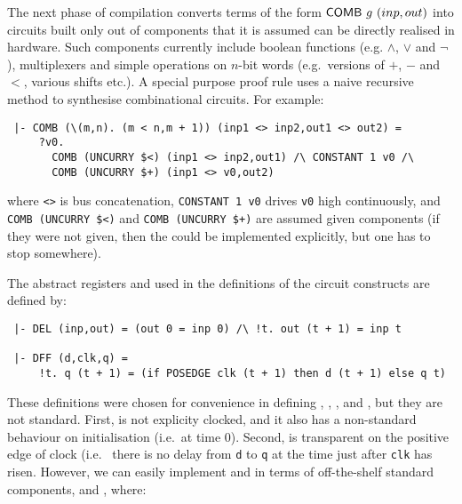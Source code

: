 The next phase of compilation converts terms of the form $\mathsf{COMB}~g~(inp,out)$
into circuits built only out of components that it is assumed can be directly realised in
hardware. Such components  currently include boolean functions (e.g. $\wedge$,
$\vee$ and $\neg$), multiplexers and simple operations  on $n$-bit words (e.g.~versions
of $+$, $-$ and $<$, various shifts etc.). 
A special purpose proof rule uses a naive recursive method to synthesise
combinational circuits. For example:

\vspace*{-2mm}

{\baselineskip10pt\begin{verbatim}
 |- COMB (\(m,n). (m < n,m + 1)) (inp1 <> inp2,out1 <> out2) =
     ?v0.
       COMB (UNCURRY $<) (inp1 <> inp2,out1) /\ CONSTANT 1 v0 /\
       COMB (UNCURRY $+) (inp1 <> v0,out2)
\end{verbatim}}
\vspace*{-2mm}

\noindent where {\verb+<>+} is bus concatenation,
{\verb+CONSTANT 1 v0+} drives \texttt{v0} high continuously, and
{\verb+COMB (UNCURRY $<)+} and {\verb&COMB (UNCURRY $+)&} are assumed
given components (if they were not given, then the could be
implemented explicitly, but one has to stop somewhere). 
 
The abstract registers  and  used in the definitions of
the circuit constructs are defined by:

\vspace*{-2mm}

{\baselineskip10pt\begin{verbatim}
 |- DEL (inp,out) = (out 0 = inp 0) /\ !t. out (t + 1) = inp t 

 |- DFF (d,clk,q) =
     !t. q (t + 1) = (if POSEDGE clk (t + 1) then d (t + 1) else q t)
\end{verbatim}}

\vspace*{-2mm}

These definitions were chosen for convenience in defining
, , ,  and , but they are not standard.
First, \DEF{DEL} is not explicity clocked, and it also has a
non-standard behaviour on initialisation (i.e.~at time $0$).  Second,
\DEF{DFF} is transparent on the positive edge of clock (i.e.~ there is
no delay from \texttt{d} to
\texttt{q} at the time just after \texttt{clk} has risen. 
However, we can easily implement  and  in terms of off-the-shelf
standard components,  \DEF{REG} and \DEF{REGF}, where:

